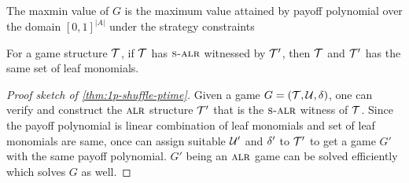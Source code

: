 \begin{proposition}
  The maxmin value of $G$ is the maximum value attained by payoff
  polynomial over the domain $[0,1]^{|A|}$ under the strategy
  constraints
\end{proposition}

\begin{lemma}
  For a game structure $\mathcal{T}$, if $\mathcal{T}$ has $\textsc{s-alr}$ witnessed by
  $\mathcal{T}'$, then $\mathcal{T}$ and $\mathcal{T}'$ has the same set of leaf monomials.
\end{lemma}

\begin{proof}[Proof sketch of \cref{thm:1p-shuffle-ptime}]
  Given a game $G = (\mathcal{T}, \mathcal{U}, \delta)$, one can verify and construct the
  $\textsc{alr}$ structure $\mathcal{T}'$ that is the $\textsc{s-alr}$ witness of $\mathcal{T}$. Since
  the payoff polynomial is linear combination of leaf monomials and
  set of leaf monomials are same, once can assign suitable $\mathcal{U}'$ and
  $\delta'$ to $\mathcal{T}'$ to get a game $G'$ with the same payoff
  polynomial. $G'$ being an $\textsc{alr}$ game can be solved efficiently
  which solves $G$ as well.
\end{proof}

\endinput


\emph{Payoff polynomial}~:~ The space of behavioral strategy profiles
in a game $G$ can be expressed by fixing variables for actions in
$G$. The symbolic strategy $X_{\Max}$ of $\Max$ in $G$ is the set of
variables $X_{\Max} = \{x^I_a| I \in \Ii_{\Max}, a \in Act(I) \}$
where $x^I_a$ is assigned to the action $a$ from information set $I$ in
$G$. The symbolic strategy $X_{\Min}$ of $\Min$ is defined
similarly. The symbolic strategy profile is given by
$X = X_{\Max} \cup X_{\Min}$.  \soum{introduce leaf monomial and
  express payoff polynomial as linear combination of leaf monomials}
The \emph{payoff polynomials} given by $\Ee_G(X)$, a polynomial, is
the expected payoff under the strategy profile $X$ where $x^I_a$ is
treated as the probability of playing action $a$ at information set
$I$.  A symbolic strategy profile in itself doesn't denote any
particular behavioral strategy.  However, a valuation of $X$ in
$[0,1]^{|\Ii|}$ satisfying the \emph{strategy constraints}
\[ \forall I \in \Ii,~ \sum\limits_{a \in Act(I)} x^I_{a} = 1\] gives
a behavioral strategy. The corresponding valuation of the payoff
polynomial is the corresponding expected payoff. There is a one-to-one
correspondence between valuations of $X$ over $[0,1]^{|\Ii|}$ and the
space of behavioral strategy profiles in $G$.

\begin{lemma}
  Let $G$ be a game. Then the maxmin value of $G$ is given by (state
  in terms of payoff polynomial)
\end{lemma}

